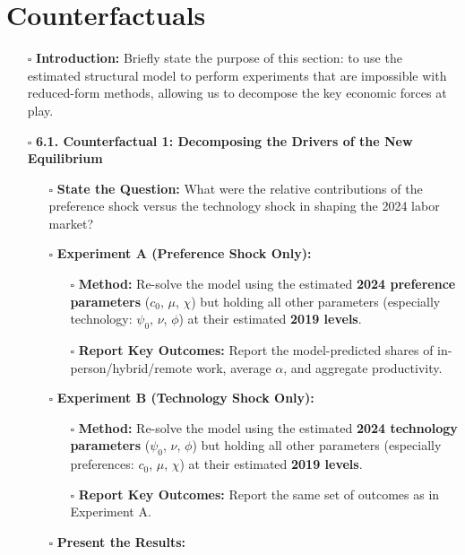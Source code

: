 \documentclass[
  11pt,
  letterpaper,
  DIV=11,
  numbers=noendperiod]{scrartcl}
\providecommand{\tightlist}{%
  \setlength{\itemsep}{0pt}\setlength{\parskip}{0pt}}\usepackage{longtable,booktabs,array}
\begin{document}
\section{\texorpdfstring{\textbf{Counterfactuals}}{Counterfactuals}}\label{counterfactuals}

\begin{itemize}
\item[$\square$]
  \textbf{Introduction:} Briefly state the purpose of this section: to
  use the estimated structural model to perform experiments that are
  impossible with reduced-form methods, allowing us to decompose the key
  economic forces at play.
\item[$\square$]
  \textbf{6.1. Counterfactual 1: Decomposing the Drivers of the New
  Equilibrium}

  \begin{itemize}
  \tightlist
  \item[$\square$]
    \textbf{State the Question:} What were the relative contributions of
    the preference shock versus the technology shock in shaping the 2024
    labor market?
  \item[$\square$]
    \textbf{Experiment A (Preference Shock Only):}

    \begin{itemize}
    \tightlist
    \item[$\square$]
      \textbf{Method:} Re-solve the model using the estimated
      \textbf{2024 preference parameters} (\(c_0\), \(\mu\), \(\chi\))
      but holding all other parameters (especially technology:
      \(\psi_0\), \(\nu\), \(\phi\)) at their estimated \textbf{2019
      levels}.
    \item[$\square$]
      \textbf{Report Key Outcomes:} Report the model-predicted shares of
      in-person/hybrid/remote work, average \(\alpha\), and aggregate
      productivity.
    \end{itemize}
  \item[$\square$]
    \textbf{Experiment B (Technology Shock Only):}

    \begin{itemize}
    \tightlist
    \item[$\square$]
      \textbf{Method:} Re-solve the model using the estimated
      \textbf{2024 technology parameters} (\(\psi_0\), \(\nu\),
      \(\phi\)) but holding all other parameters (especially
      preferences: \(c_0\), \(\mu\), \(\chi\)) at their estimated
      \textbf{2019 levels}.
    \item[$\square$]
      \textbf{Report Key Outcomes:} Report the same set of outcomes as
      in Experiment A.
    \end{itemize}
  \item[$\square$]
    \textbf{Present the Results:}


\end{itemize}
\end{itemize}
\end{document}
